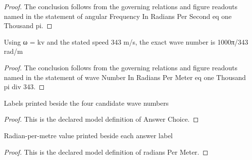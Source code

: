 \begin{proof}
  The conclusion follows from the governing relations and figure readouts named in the statement of angular Frequency In Radians Per Second eq one Thousand pi.
\end{proof}
\begin{lemma}
  \label{lem:physics:phyx-mini-0309:phyxminiproblems-problemphyxmini0309-wavenumberinradianspermeter-eq-onethousand-pi-div-343}
  Using ω = kv and the stated speed 343 m/s, the exact wave number is 1000π/343 rad/m
\end{lemma}
\begin{proof}
  The conclusion follows from the governing relations and figure readouts named in the statement of wave Number In Radians Per Meter eq one Thousand pi div 343.
\end{proof}
\begin{definition}
  \label{def:physics:phyx-mini-0309:phyxminiproblems-problemphyxmini0309-answerchoice}
  Labels printed beside the four candidate wave numbers
\end{definition}
\begin{proof}
  This is the declared model definition of Answer Choice.
\end{proof}
\begin{definition}
  \label{def:physics:phyx-mini-0309:phyxminiproblems-problemphyxmini0309-answerchoice-radianspermeter}
  Radian-per-metre value printed beside each answer label
\end{definition}
\begin{proof}
  This is the declared model definition of radians Per Meter.
\end{proof}
